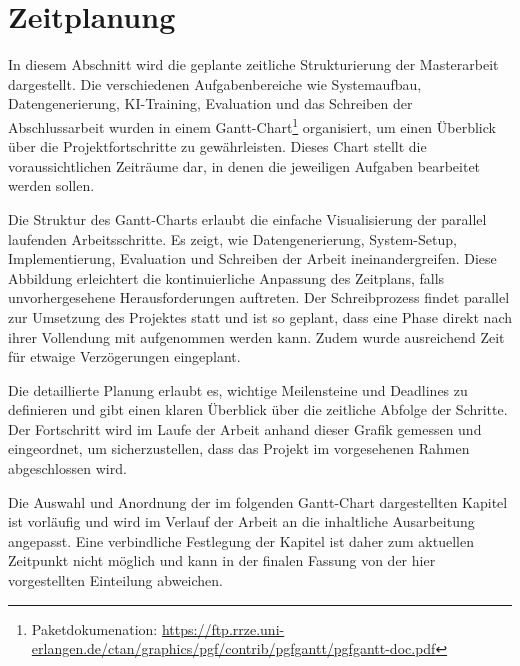 
\section{Zeitplanung}
\label{sec:zeitplanung}

In diesem Abschnitt wird die geplante zeitliche Strukturierung der Masterarbeit dargestellt. Die verschiedenen Aufgabenbereiche wie Systemaufbau, Datengenerierung, KI-Training, Evaluation und das Schreiben der Abschlussarbeit wurden in einem Gantt-Chart\footnote{Paketdokumenation: \url{https://ftp.rrze.uni-erlangen.de/ctan/graphics/pgf/contrib/pgfgantt/pgfgantt-doc.pdf}} organisiert, um einen Überblick über die Projektfortschritte zu gewährleisten. Dieses Chart stellt die voraussichtlichen Zeiträume dar, in denen die jeweiligen Aufgaben bearbeitet werden sollen.

Die Struktur des Gantt-Charts erlaubt die einfache Visualisierung der parallel laufenden Arbeitsschritte. Es zeigt, wie Datengenerierung, System-Setup, Implementierung, Evaluation und Schreiben der Arbeit ineinandergreifen. Diese Abbildung erleichtert die kontinuierliche Anpassung des Zeitplans, falls unvorhergesehene Herausforderungen auftreten. Der Schreibprozess findet parallel zur Umsetzung des Projektes statt und ist so geplant, dass eine Phase direkt nach ihrer Vollendung mit aufgenommen werden kann. Zudem wurde ausreichend Zeit für etwaige Verzögerungen eingeplant.

Die detaillierte Planung erlaubt es, wichtige Meilensteine und Deadlines zu definieren und gibt einen klaren Überblick über die zeitliche Abfolge der Schritte. Der Fortschritt wird im Laufe der Arbeit anhand dieser Grafik gemessen und eingeordnet, um sicherzustellen, dass das Projekt im vorgesehenen Rahmen abgeschlossen wird.

Die Auswahl und Anordnung der im folgenden Gantt-Chart dargestellten Kapitel ist vorläufig und wird im Verlauf der Arbeit an die inhaltliche Ausarbeitung angepasst. Eine verbindliche Festlegung der Kapitel ist daher zum aktuellen Zeitpunkt nicht möglich und kann in der finalen Fassung von der hier vorgestellten Einteilung abweichen.


